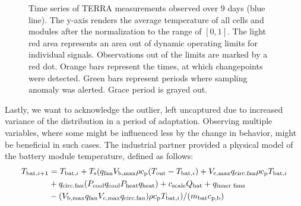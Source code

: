 \begin{figure}[htbp]
 \centering
 \caption{Time series of TERRA measurements observed over 9 days (blue line). The y-axis renders the average temperature of all cells and modules after the normalization to the range of $[0, 1]$. The light red area represents an area out of dynamic operating limits for individual signals. Observations out of the limits are marked by a red dot. Orange bars represent the times, at which changepoints were detected. Green bars represent periods where sampling anomaly was alerted. Grace period is grayed out.}
 \label{fig:terra_sampling}
\end{figure}

Lastly, we want to acknowledge the outlier, left uncaptured due to increased variance of the distribution in a period of adaptation. Observing multiple variables, where some might be influenced less by the change in behavior, might be beneficial in such cases. The industrial partner provided a physical model of the battery module temperature, defined as follows:
\begin{align}
 T _{\text{bat}, i+1} &= T _{\text{bat}, i} + T _{\text{s}} (q _{\text{fan}} V _{\text{b,max}} \rho c _{\text{p}} (T _{\text{out}} - T _{\text{bat}, i}) + V _{\text{c,max}}q _{\text{circ.fan}} \rho c _{\text{p}} T _{\text{bat}, i} \nonumber \\
 &+ q _{\text{circ.fan}} (P _{\text{cool}} q _{\text{cool}} P _{\text{heat}} q _{\text{heat}}) + c _{\text{scale}} Q _{\text{bat}} + q _{\text{inner fans}} \\
 &- (V _{\text{b,max}} q _{\text{fan}} V _{\text{c,max}} q _{\text{circ.fan}}) \rho c _{\text{p}} T _{\text{bat}, i}) / (m _{\text{bat}} c _{\text{p,b}}) \text{}\nonumber
\end{align}

